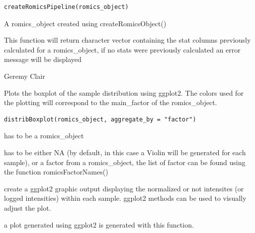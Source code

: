 \documentclass[a4paper]{book}
\begin{document}
%
\begin{Usage}
\begin{verbatim}
createRomicsPipeline(romics_object)
\end{verbatim}
\end{Usage}
%
\begin{Arguments}
\begin{ldescription}
\item[\code{romics\_object}] A romics\_object created using createRomicsObject()
\end{ldescription}
\end{Arguments}
%
\begin{Value}
This function will return character vector containing the stat columns previously calculated for a romics\_object, if no stats were previously calculated an error message will be displayed
\end{Value}
%
\begin{Author}
Geremy Clair
\end{Author}
%
\begin{Description}
Plots the boxplot of the sample distribution using ggplot2. The colors used for the plotting will correspond to the main\_factor of the romics\_object.
\end{Description}
%
\begin{Usage}
\begin{verbatim}
distribBoxplot(romics_object, aggregate_by = "factor")
\end{verbatim}
\end{Usage}
%
\begin{Arguments}
\begin{ldescription}
\item[\code{romics\_object}] has to be a romics\_object

\item[\code{aggregate\_by}] has to be either NA (by default, in this case a Violin will be generated for each sample), or a factor from a romics\_object, the list of factor can be found using the function romicsFactorNames()
\end{ldescription}
\end{Arguments}
%
\begin{Details}
create a ggplot2 graphic output displaying the normalized or not intensites (or logged intensities) within each sample. ggplot2 methods can be used to visually adjust the plot.
\end{Details}
%
\begin{Value}
a plot generated using ggplot2 is generated with this function.
\end{Value}
\end{document}
